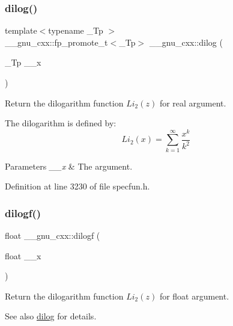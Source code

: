 \subsubsection{\texorpdfstring{dilog()}{dilog()}}
{\footnotesize\ttfamily template$<$typename \+\_\+\+Tp $>$ \\
\+\_\+\+\_\+gnu\+\_\+cxx\+::fp\+\_\+promote\+\_\+t$<$\+\_\+\+Tp$>$ \+\_\+\+\_\+gnu\+\_\+cxx\+::dilog (\begin{DoxyParamCaption}\item[{\+\_\+\+Tp}]{\+\_\+\+\_\+x }\end{DoxyParamCaption})\hspace{0.3cm}{\ttfamily [inline]}}

Return the dilogarithm function $ Li_2(z) $ for real argument.

The dilogarithm is defined by\+: \[ Li_2(x) = \sum_{k=1}^{\infty}\frac{x^k}{k^2} \]


\begin{DoxyParams}{Parameters}
{\em \+\_\+\+\_\+x} & The argument. \\
\hline
\end{DoxyParams}


Definition at line 3230 of file specfun.\+h.

\mbox{\label{group__mathsf__gnu_ga901091e0e7ce7d6113ae6a86f4865a92}} 
\subsubsection{\texorpdfstring{dilogf()}{dilogf()}}
{\footnotesize\ttfamily float \+\_\+\+\_\+gnu\+\_\+cxx\+::dilogf (\begin{DoxyParamCaption}\item[{float}]{\+\_\+\+\_\+x }\end{DoxyParamCaption})\hspace{0.3cm}{\ttfamily [inline]}}

Return the dilogarithm function $ Li_2(z) $ for {\ttfamily float} argument.

\begin{DoxySeeAlso}{See also}
\hyperlink{group__mathsf__gnu_ga4185ee1a0f9189a18085f65d52b6bc9b}{dilog} for details. 
\end{DoxySeeAlso}


